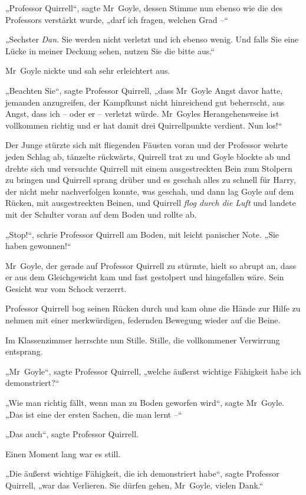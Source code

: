 {„Professor Quirrell“, sagte Mr~Goyle, dessen Stimme nun ebenso wie die des Professors verstärkt wurde, „darf ich fragen, welchen Grad --“

„Sechster \emph{Dan}. Sie werden nicht verletzt und ich ebenso wenig. Und falls Sie eine Lücke in meiner Deckung sehen, nutzen Sie die bitte aus.“

Mr~Goyle nickte und sah sehr erleichtert aus.

„Beachten Sie“, sagte Professor Quirrell, „dass Mr~Goyle Angst davor hatte, jemanden anzugreifen, der Kampfkunst nicht hinreichend gut beherrscht, aus Angst, dass ich -- oder er -- verletzt würde. Mr~Goyles Herangehensweise ist vollkommen richtig und er hat damit drei Quirrellpunkte verdient. Nun los!“

Der Junge stürzte sich mit fliegenden Fäusten voran und der Professor wehrte jeden Schlag ab, tänzelte rückwärts, Quirrell trat zu und Goyle blockte ab und drehte sich und versuchte Quirrell mit einem ausgestreckten Bein zum Stolpern zu bringen und Quirrell sprang drüber und es geschah alles zu schnell für Harry, der nicht mehr nachverfolgen konnte, was geschah, und dann lag Goyle auf dem Rücken, mit ausgestreckten Beinen, und Quirrell \emph{flog durch die Luft} und landete mit der Schulter voran auf dem Boden und rollte ab.

„Stop!“, schrie Professor Quirrell am Boden, mit leicht panischer Note. „Sie haben gewonnen!“

Mr~Goyle, der gerade auf Professor Quirrell zu stürmte, hielt so abrupt an, dass er aus dem Gleichgewicht kam und fast gestolpert und hingefallen wäre. Sein Gesicht war vom Schock verzerrt.

Professor Quirrell bog seinen Rücken durch und kam ohne die Hände zur Hilfe zu nehmen mit einer merkwürdigen, federnden Bewegung wieder auf die Beine.

Im Klassenzimmer herrschte nun Stille. Stille, die vollkommener Verwirrung entsprang.

„Mr~Goyle“, sagte Professor Quirrell, „welche äußerst wichtige Fähigkeit habe ich demonstriert?“

„Wie man richtig fällt, wenn man zu Boden geworfen wird“, sagte Mr~Goyle. „Das ist eine der ersten Sachen, die man lernt --“

„Das auch“, sagte Professor Quirrell.

Einen Moment lang war es still.

„Die äußerst wichtige Fähigkeit, die ich demonstriert habe“, sagte Professor Quirrell, „war das Verlieren. Sie dürfen gehen, Mr~Goyle, vielen Dank.“

}
